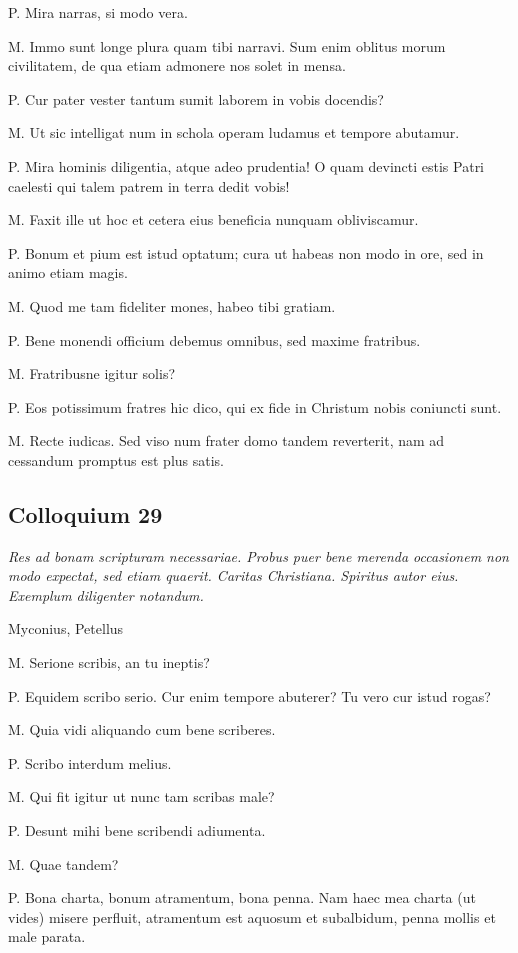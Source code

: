 \documentclass{article}
\begin{document}
P. Mira narras, si modo vera. 

M. Immo sunt longe plura quam tibi narravi. Sum enim oblitus morum civilitatem, de qua etiam admonere nos solet in mensa.

P. Cur pater vester tantum sumit laborem in vobis docendis?

M. Ut sic intelligat num in schola operam ludamus et tempore abutamur. 

P. Mira hominis diligentia, atque adeo prudentia! O quam devincti estis Patri caelesti qui talem patrem in terra dedit vobis!

M. Faxit ille ut hoc et cetera eius beneficia nunquam obliviscamur. 

P. Bonum et pium est istud optatum; cura ut habeas non modo in ore, sed in animo etiam magis. 

M. Quod me tam fideliter mones, habeo tibi gratiam. 

P. Bene monendi officium debemus omnibus, sed maxime fratribus. 

M. Fratribusne igitur solis?

P. Eos potissimum fratres hic dico, qui ex fide in Christum nobis coniuncti sunt. 

M. Recte iudicas. Sed viso num frater domo tandem reverterit, nam ad cessandum promptus est plus satis. 

\subsection{Colloquium 29}
\emph{Res ad bonam scripturam necessariae. Probus puer bene merenda occasionem non modo expectat, sed etiam quaerit. Caritas Christiana. Spiritus autor eius. Exemplum diligenter notandum.}

Myconius, Petellus

M. Serione scribis, an tu ineptis?

P. Equidem scribo serio. Cur enim tempore abuterer? Tu vero cur istud rogas?

M. Quia vidi aliquando cum bene scriberes. 

P. Scribo interdum melius. 

M. Qui fit igitur ut nunc tam scribas male?

P. Desunt mihi bene scribendi adiumenta. 

M. Quae tandem?

P. Bona charta, bonum atramentum, bona penna. Nam haec mea charta (ut vides) misere perfluit, atramentum est aquosum et subalbidum, penna mollis et male parata. 
\end{document}
